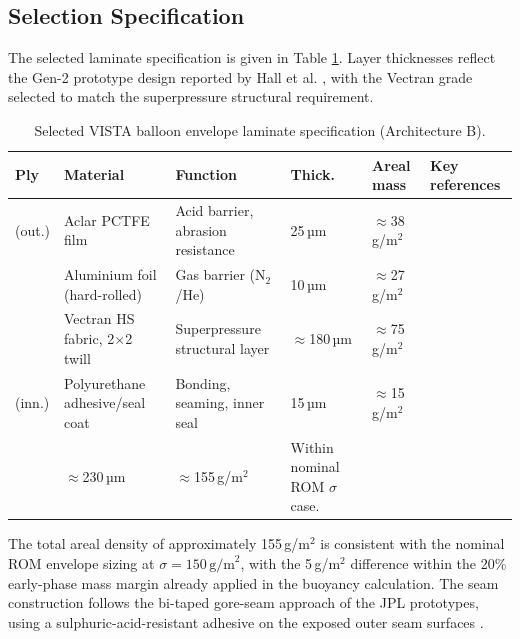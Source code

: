 \subsection{Selection Specification}


The selected laminate specification is given in Table \ref{tab:laminate-spec}. Layer thicknesses reflect the Gen-2 prototype design reported by Hall et al. \cite{Hall2011_TechDev}, with the Vectran grade selected to match the superpressure structural requirement.

\begin{table}[H]
\centering
\caption{Selected VISTA balloon envelope laminate specification (Architecture B).}
\label{tab:laminate-spec}
\footnotesize
\renewcommand{\arraystretch}{1.18}
\setlength{\tabcolsep}{4pt}
\begin{tabularx}{\linewidth}{@{}
>{\centering\arraybackslash}p{0.5cm}
p{4cm}
p{4cm}
p{2.2cm}
p{1.5cm}
X
@{}}
\toprule
\textbf{Ply} & \textbf{Material} & \textbf{Function} & \textbf{Thick.} & \textbf{Areal mass} & \textbf{Key references} \\
\midrule
1 (out.) & Aclar PCTFE film & Acid barrier, abrasion resistance & 25\,µm & $\approx$38\,g/m$^2$ & \cite{Hall2011_TechDev,PCTFE_Permeability_Guide} \\
2 & Aluminium foil (hard-rolled) & Gas barrier (N$_2$/He) & 10\,µm & $\approx$27\,g/m$^2$ & \cite{Hall2011_TechDev} \\
3 & Vectran HS fabric, 2$\times$2 twill & Superpressure structural layer & $\approx$180\,µm & $\approx$75\,g/m$^2$ & \cite{Hall2007_VenusPrototype,VectranReview2021} \\
4 (inn.) & Polyurethane adhesive/seal coat & Bonding, seaming, inner seal & 15\,µm & $\approx$15\,g/m$^2$ & \cite{Hall2007_VenusPrototype} \\
\midrule
\multicolumn{3}{l}{\textbf{Total laminate}} & $\approx$230\,µm & $\approx$155\,g/m$^2$ & Within nominal ROM $\sigma$ case. \\
\bottomrule
\end{tabularx}
\end{table}

\noindent The total areal density of approximately 155\,g/m$^2$ is consistent with the nominal ROM envelope sizing at $\sigma = 150\,\text{g/m}^2$, with the 5\,g/m$^2$ difference within the 20\% early-phase mass margin already applied in the buoyancy calculation. The seam construction follows the bi-taped gore-seam approach of the JPL prototypes, using a sulphuric-acid-resistant adhesive on the exposed outer seam surfaces \cite{Hall2007_VenusPrototype}.



